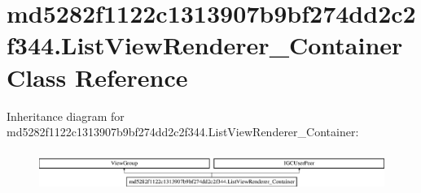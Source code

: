\hypertarget{classmd5282f1122c1313907b9bf274dd2c2f344_1_1ListViewRenderer__Container}{}\section{md5282f1122c1313907b9bf274dd2c2f344.\+List\+View\+Renderer\+\_\+\+Container Class Reference}
\label{classmd5282f1122c1313907b9bf274dd2c2f344_1_1ListViewRenderer__Container}
Inheritance diagram for md5282f1122c1313907b9bf274dd2c2f344.\+List\+View\+Renderer\+\_\+\+Container\+:\begin{figure}[H]
\begin{center}
\leavevmode
\includegraphics[height=1.320755cm]{classmd5282f1122c1313907b9bf274dd2c2f344_1_1ListViewRenderer__Container}
\end{center}
\end{figure}
